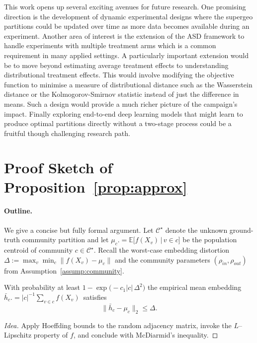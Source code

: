 \documentclass[final,3p,fleqn, 10pt]{elsarticle}
\begin{document}
This work opens up several exciting avenues for future research. One promising direction is the development of dynamic experimental designs where the supergeo partitions could be updated over time as more data becomes available during an experiment. Another area of interest is the extension of the ASD framework to handle experiments with multiple treatment arms which is a common requirement in many applied settings. A particularly important extension would be to move beyond estimating average treatment effects to understanding distributional treatment effects. This would involve modifying the objective function to minimise a measure of distributional distance such as the Wasserstein distance or the Kolmogorov-Smirnov statistic instead of just the difference in means. Such a design would provide a much richer picture of the campaign's impact. Finally exploring end-to-end deep learning models that might learn to produce optimal partitions directly without a two-stage process could be a fruitful though challenging research path.




\appendix
\section{Proof Sketch of Proposition~\ref{prop:approx}}\label{app:proof_prop1}
\paragraph{Outline.} We give a concise but fully formal argument.  Let $\mathcal{C}^{\star}$ denote the unknown ground-truth community partition and let $\mu_{c}.=\mathbb E\bigl[f(X_v)\,\big|\,v\in c\bigr]$ be the population centroid of community $c\in\mathcal{C}^{\star}$.  Recall the worst-case embedding distortion $\Delta:=\max_{v}\min_{c}\|f(X_v)-\mu_{c}\|$ and the community parameters $(\rho_{in},\rho_{out})$ from Assumption~\ref{assump:community}.

\begin{lemma}\label{lem:conc}
With probability at least $1-\exp\!\bigl(-c_1|c|\,\Delta^{2}\bigr)$ the empirical mean embedding \,$\bar h_{c}.=|c|^{-1}\sum_{v\in c}f(X_v)$\, satisfies 
\[\|\bar h_{c}-\mu_{c}\|_2\le\Delta.\]
\end{lemma}
\begin{proof}[Idea]
Apply Hoeffding bounds to the random adjacency matrix, invoke the $L$–Lipschitz property of $f$, and conclude with McDiarmid’s inequality.
\end{proof}
\end{document}
